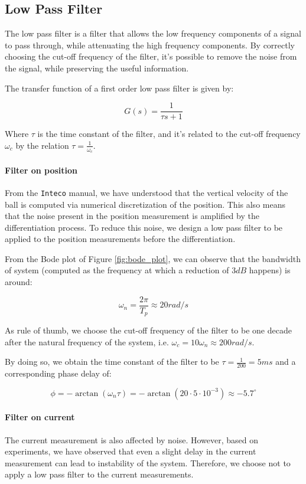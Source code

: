 \subsection{Low Pass Filter}
\label{sec:low_pass_filter}

The low pass filter is a filter that allows the low frequency components of a signal to pass through, while attenuating the high frequency components.
By correctly choosing the cut-off frequency of the filter, it's possible to remove the noise from the signal, while preserving the useful information.

The transfer function of a first order low pass filter is given by:

\begin{equation}
    G(s) = \frac{1}{\tau s + 1}
\end{equation}

Where $\tau$ is the time constant of the filter, and it's related to the cut-off frequency $\omega_c$ by the relation $\tau = \frac{1}{\omega_c}$.

\paragraph{Filter on position}

From the \texttt{Inteco} manual, we have understood that the vertical velocity of the ball is computed via numerical discretization of the position.
This also means that the noise present in the position measurement is amplified by the differentiation process.
To reduce this noise, we design a low pass filter to be applied to the position measurements before the differentiation.

From the Bode plot of Figure \ref{fig:bode_plot}, we can observe that the bandwidth of system (computed as the frequency at which a reduction of $3dB$ happens) is around:

\begin{equation}
    \omega_n = \frac{2\pi}{T_p} \approx 20 rad/s
\end{equation}

As rule of thumb, we choose the cut-off frequency of the filter to be one decade after the natural frequency of the system, i.e. $\omega_c = 10 \omega_n \approx 200 rad/s$.

By doing so, we obtain the time constant of the filter to be $\tau = \frac{1}{200} = 5 ms$ and a corresponding phase delay of:

\begin{equation}
    \phi = -\arctan{(\omega_n \tau)} = -\arctan{(20 \cdot 5 \cdot 10^{-3})} \approx -5.7^{\circ}
\end{equation}


\paragraph{Filter on current}

The current measurement is also affected by noise.
However, based on experiments, we have observed that even a slight delay in the current measurement can lead to instability of the system.
Therefore, we choose not to apply a low pass filter to the current measurements.

